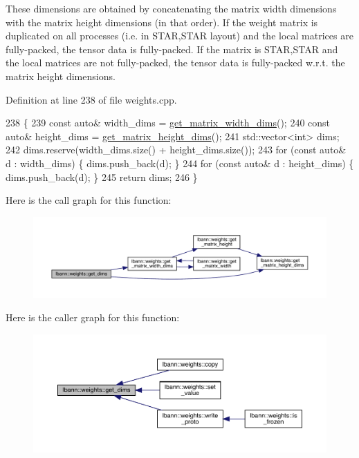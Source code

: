 These dimensions are obtained by concatenating the matrix width dimensions with the matrix height dimensions (in that order). If the weight matrix is duplicated on all processes (i.\+e. in S\+T\+AR,S\+T\+AR layout) and the local matrices are fully-\/packed, the tensor data is fully-\/packed. If the matrix is S\+T\+AR,S\+T\+AR and the local matrices are not fully-\/packed, the tensor data is fully-\/packed w.\+r.\+t. the matrix height dimensions. 

Definition at line 238 of file weights.\+cpp.


\begin{DoxyCode}
238                                        \{
239   \textcolor{keyword}{const} \textcolor{keyword}{auto}& width\_dims = \hyperlink{classlbann_1_1weights_a783ce38ed0b75c0264dd7e28911d5ec0}{get\_matrix\_width\_dims}();
240   \textcolor{keyword}{const} \textcolor{keyword}{auto}& height\_dims = \hyperlink{classlbann_1_1weights_a2971f04c57d90fbb09631b1de3dad336}{get\_matrix\_height\_dims}();
241   std::vector<int> dims;
242   dims.reserve(width\_dims.size() + height\_dims.size());
243   \textcolor{keywordflow}{for} (\textcolor{keyword}{const} \textcolor{keyword}{auto}& d : width\_dims)  \{ dims.push\_back(d); \}
244   \textcolor{keywordflow}{for} (\textcolor{keyword}{const} \textcolor{keyword}{auto}& d : height\_dims) \{ dims.push\_back(d); \}
245   \textcolor{keywordflow}{return} dims;
246 \}
\end{DoxyCode}
Here is the call graph for this function\+:\nopagebreak
\begin{figure}[H]
\begin{center}
\leavevmode
\includegraphics[width=350pt]{classlbann_1_1weights_ac1f4e6725fc8b265e0ed5dfe140a321a_cgraph}
\end{center}
\end{figure}
Here is the caller graph for this function\+:\nopagebreak
\begin{figure}[H]
\begin{center}
\leavevmode
\includegraphics[width=350pt]{classlbann_1_1weights_ac1f4e6725fc8b265e0ed5dfe140a321a_icgraph}
\end{center}
\end{figure}
